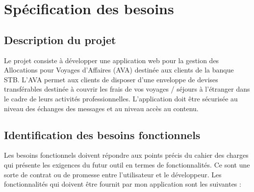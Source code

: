 
\chapter{Spécification des besoins}

\setcounter{page}{1}
\thispagestyle{empty}

\newpage


\fancyhf{}%
{\headrule
  { \thepage}\footrule}
\pagestyle{ruled}

\renewcommand\makeheadrule{\color{cyan}\rule[-.3\baselineskip]{\linewidth}{2.5pt}}
\renewcommand\makefootrule{\color{cyan}\rule[\baselineskip]{\linewidth}{2.5pt}}



 \section{Description du projet}
Le projet consiste à développer une application web pour la gestion des Allocations pour Voyages d'Affaires (AVA) destinée aux clients de la banque STB.
L'AVA permet aux clients de disposer d'une enveloppe de devises transférables destinée à couvrir les frais de vos voyages / séjours à l'étranger dans le cadre de leurs activités professionnelles.
L'application doit être sécurisée au niveau des échanges des messages et au niveau accès au contenu.
 
 \section{Identification des besoins fonctionnels}

Les besoins fonctionnels doivent répondre aux points précis du cahier des charges qui présente les exigences du futur outil en termes de fonctionnalités. Ce sont une sorte de contrat ou de promesse entre l'utilisateur et le développeur. Les fonctionnalités qui doivent être fournit par mon application sont les suivantes : 

